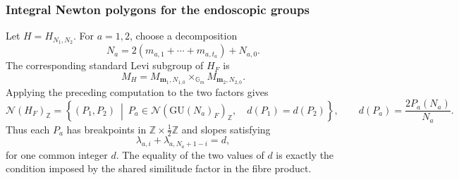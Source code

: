 \documentclass[11pt,a4paper]{article}
\theoremstyle{definition}
\theoremstyle{plain}
\theoremstyle{remark}
\theoremstyle{plain}
\begin{document}
\subsubsection{Integral Newton polygons for the endoscopic groups}
Let $H=H_{N_1,N_2}$. For $a=1,2$, choose a decomposition
$$
N_a=2(m_{a,1}+\cdots+m_{a,t_a})+N_{a,0}.
$$
The corresponding standard Levi subgroup of $H_F$ is
$$
M_H=M_{\boldsymbol m_1,N_{1,0}}
\times_{\mathbb G_m}
M_{\boldsymbol m_2,N_{2,0}}.
$$
Applying the preceding computation to the two factors gives
$$
\mathcal N(H_F)_{\mathbb Z}
=
\left\{
(P_1,P_2)\ \middle|\
P_a\in\mathcal N(\mathrm{GU}(N_a)_F)_{\mathbb Z},\quad
d(P_1)=d(P_2)
\right\},
\qquad
d(P_a)=\frac{2P_a(N_a)}{N_a}.
$$
Thus each $P_a$ has breakpoints in $\mathbb Z\times\frac12\mathbb Z$ and slopes satisfying
$$
\lambda_{a,i}+\lambda_{a,N_a+1-i}=d,
$$
for one common integer $d$. The equality of the two values of $d$ is exactly the condition imposed by the shared similitude factor in the fibre product.
\end{document}
